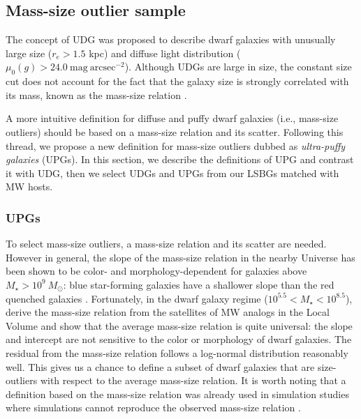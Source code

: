 \documentclass[twocolumn,astrosymb,twocolappendix]{aastex631}
\newcommand{\sbunit}{\mathrm{mag\ arcsec}^{-2}}
\newcommand{\sbcen}{\mu_{0}(g)}
\begin{document}
\begin{CJK*}{UTF8}{gbsn}
\subsection{Mass-size outlier sample}\label{sec:sample}
The concept of UDG was proposed to describe dwarf galaxies with unusually large size ($r_e>1.5$ kpc) and diffuse light distribution ($\sbcen > 24.0\ \sbunit$). Although UDGs are large in size, the constant size cut does not account for the fact that the galaxy size is strongly correlated with its mass, known as the mass-size relation \citep[e.g.,][]{Graham2003,Trujillo2007,vanDokkum2013,Cappellari2013,Lange2015}. 

A more intuitive definition for diffuse and puffy dwarf galaxies (i.e., mass-size outliers) should be based on a mass-size relation and its scatter. Following this thread, we propose a new definition for mass-size outliers dubbed as \textit{ultra-puffy galaxies} (UPGs). In this section, we describe the definitions of UPG and contrast it with UDG, then we select UDGs and UPGs from our LSBGs matched with MW hosts. 

\subsubsection{UPGs}
To select mass-size outliers, a mass-size relation and its scatter are needed. However in general, the slope of the mass-size relation in the nearby Universe has been shown to be color- and morphology-dependent for galaxies above $M_\star > 10^{9}\ M_\odot$: blue star-forming galaxies have a shallower slope than the red quenched galaxies \citep[e.g.,][]{Lange2015}. Fortunately, in the dwarf galaxy regime ($10^{5.5} < M_\star < 10^{8.5}$), \citet{ELVES-I} derive the mass-size relation from the satellites of MW analogs in the Local Volume and show that the average mass-size relation is quite universal: the slope and intercept are not sensitive to the color or morphology of dwarf galaxies. The residual from the mass-size relation follows a log-normal distribution reasonably well. This gives us a chance to define a subset of dwarf galaxies that are size-outliers with respect to the average mass-size relation. It is worth noting that a definition based on the mass-size relation was already used in simulation studies where simulations cannot reproduce the observed mass-size relation \citep[e.g.,][]{Benavides2021,Benavides2022}. 


\end{CJK*}
\end{document}
